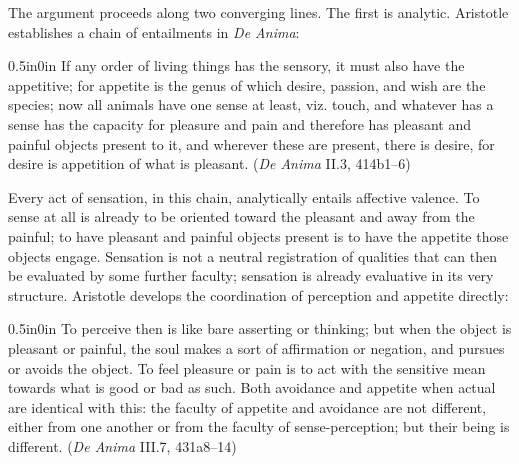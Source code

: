\documentclass{article}
\begin{document}
The argument proceeds along two converging lines. The first is analytic. Aristotle establishes a chain of entailments in \textit{De Anima}:
\begin{adjustwidth}{0.5in}{0in}
If any order of living things has the sensory, it must also have the appetitive; for appetite is the genus of which desire, passion, and wish are the species; now all animals have one sense at least, viz. touch, and whatever has a sense has the capacity for pleasure and pain and therefore has pleasant and painful objects present to it, and wherever these are present, there is desire, for desire is appetition of what is pleasant. (\textit{De Anima} II.3, 414b1--6)
\end{adjustwidth}
Every act of sensation, in this chain, analytically entails affective valence. To sense at all is already to be oriented toward the pleasant and away from the painful; to have pleasant and painful objects present is to have the appetite those objects engage. Sensation is not a neutral registration of qualities that can then be evaluated by some further faculty; sensation is already evaluative in its very structure. Aristotle develops the coordination of perception and appetite directly:
\begin{adjustwidth}{0.5in}{0in}
To perceive then is like bare asserting or thinking; but when the object is pleasant or painful, the soul makes a sort of affirmation or negation, and pursues or avoids the object. To feel pleasure or pain is to act with the sensitive mean towards what is good or bad as such. Both avoidance and appetite when actual are identical with this: the faculty of appetite and avoidance are not different, either from one another or from the faculty of sense-perception; but their being is different. (\textit{De Anima} III.7, 431a8--14)
\end{adjustwidth}
\end{document}
